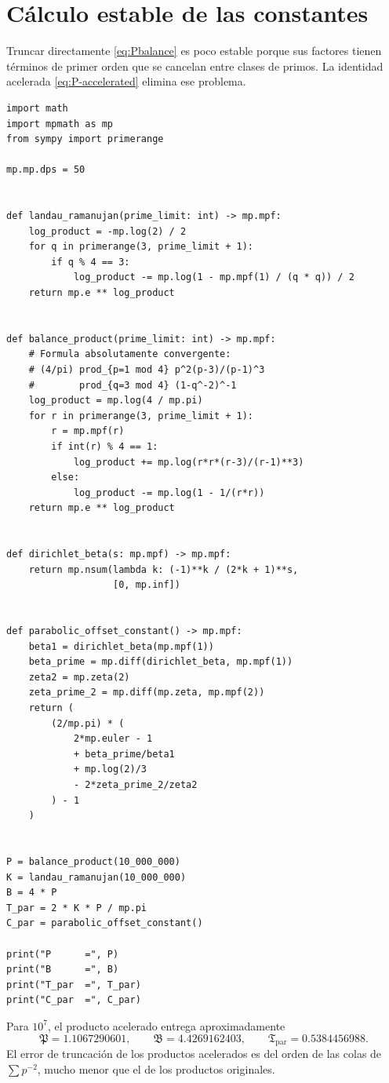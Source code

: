 \documentclass[11pt,a4paper,openany]{report}
\begin{document}
\section{Cálculo estable de las constantes}

Truncar directamente \eqref{eq:Pbalance} es poco estable porque sus factores tienen términos de primer orden que se cancelan entre clases de primos. La identidad acelerada \eqref{eq:P-accelerated} elimina ese problema.

\begin{lstlisting}[caption={Calculo de las constantes mediante productos acelerados.},label={lst:constants}]
import math
import mpmath as mp
from sympy import primerange

mp.mp.dps = 50


def landau_ramanujan(prime_limit: int) -> mp.mpf:
    log_product = -mp.log(2) / 2
    for q in primerange(3, prime_limit + 1):
        if q % 4 == 3:
            log_product -= mp.log(1 - mp.mpf(1) / (q * q)) / 2
    return mp.e ** log_product


def balance_product(prime_limit: int) -> mp.mpf:
    # Formula absolutamente convergente:
    # (4/pi) prod_{p=1 mod 4} p^2(p-3)/(p-1)^3
    #        prod_{q=3 mod 4} (1-q^-2)^-1
    log_product = mp.log(4 / mp.pi)
    for r in primerange(3, prime_limit + 1):
        r = mp.mpf(r)
        if int(r) % 4 == 1:
            log_product += mp.log(r*r*(r-3)/(r-1)**3)
        else:
            log_product -= mp.log(1 - 1/(r*r))
    return mp.e ** log_product


def dirichlet_beta(s: mp.mpf) -> mp.mpf:
    return mp.nsum(lambda k: (-1)**k / (2*k + 1)**s,
                   [0, mp.inf])


def parabolic_offset_constant() -> mp.mpf:
    beta1 = dirichlet_beta(mp.mpf(1))
    beta_prime = mp.diff(dirichlet_beta, mp.mpf(1))
    zeta2 = mp.zeta(2)
    zeta_prime_2 = mp.diff(mp.zeta, mp.mpf(2))
    return (
        (2/mp.pi) * (
            2*mp.euler - 1
            + beta_prime/beta1
            + mp.log(2)/3
            - 2*zeta_prime_2/zeta2
        ) - 1
    )


P = balance_product(10_000_000)
K = landau_ramanujan(10_000_000)
B = 4 * P
T_par = 2 * K * P / mp.pi
C_par = parabolic_offset_constant()

print("P      =", P)
print("B      =", B)
print("T_par  =", T_par)
print("C_par  =", C_par)
\end{lstlisting}

Para \(10^7\), el producto acelerado entrega aproximadamente
\[
 \mathfrak P=1.1067290601,
 \qquad
 \mathfrak B=4.4269162403,
 \qquad
 \mathfrak T_{\mathrm{par}}=0.5384456988.
\]
El error de truncación de los productos acelerados es del orden de las colas de \(\sum p^{-2}\), mucho menor que el de los productos originales.
\end{document}
